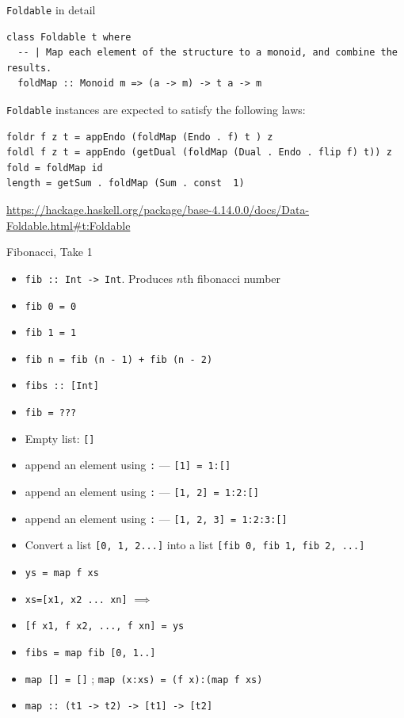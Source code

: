 \documentclass[8pt]{beamer}
\newcommand{\hs}[1]{\texttt{#1}}
\begin{document}
\begin{frame}[fragile]{\texttt{Foldable} in detail}


\begin{verbatim}
class Foldable t where
  -- | Map each element of the structure to a monoid, and combine the results.
  foldMap :: Monoid m => (a -> m) -> t a -> m
\end{verbatim}

\verb|Foldable| instances are expected to satisfy the following laws:

\begin{verbatim}
foldr f z t = appEndo (foldMap (Endo . f) t ) z
foldl f z t = appEndo (getDual (foldMap (Dual . Endo . flip f) t)) z
fold = foldMap id
length = getSum . foldMap (Sum . const  1)
\end{verbatim}
{\tiny \url{https://hackage.haskell.org/package/base-4.14.0.0/docs/Data-Foldable.html#t:Foldable}}
\end{frame}

\begin{frame}[fragile]{Fibonacci, Take 1}
\begin{itemize}
    \item \hs{fib :: Int -> Int}. Produces $n$th fibonacci number
    \item \hs{fib 0 = 0}\pause
    \item \hs{fib 1 = 1}\pause
    \item \hs{fib n = fib (n - 1) + fib (n - 2)}\pause
    \item \hs{fibs :: [Int]} \pause
    \item \hs{fib = ???}\pause
    \item Empty list: \hs{[]} \pause
    \item append an element using \hs{:} --- \hs{[1] = 1:[]}\pause
    \item append an element using \hs{:} --- \hs{[1, 2] = 1:2:[]}\pause
    \item append an element using \hs{:} --- \hs{[1, 2, 3] = 1:2:3:[]}\pause
    \item Convert a list \hs{[0, 1, 2...]} into a list \hs{[fib 0, fib 1, fib 2, ...]}
\end{itemize}

\pause

\begin{itemize}
    \item \hs{ys = map f xs}
    \item \hs{xs=[x1, x2 ... xn]} $\implies$
    \item \hs{[f x1, f x2, ..., f xn] = ys}
    \item \hs{fibs = map fib [0, 1..]} \pause
    \item \hs{map [] = []} \pause; \hs{map (x:xs) = (f x):(map f xs)}\pause
    \item \hs{map :: (t1 -> t2) -> [t1] -> [t2]}
\end{itemize}
\pause
\end{frame}
\end{document}
